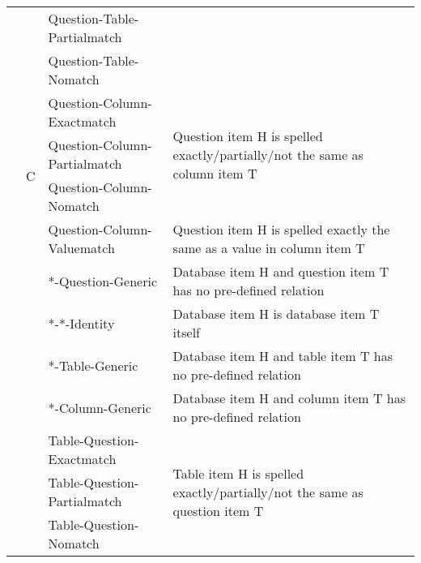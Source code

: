 \documentclass[11pt]{article}
\begin{document}
\begin{table*}
{\begin{tabular}{llll}
                        &                     & Question-Table-Partialmatch  &\\
&                     & Question-Table-Nomatch       &   
\\ \midrule
    \multirow{4}{*}{}  & \multirow{4}{*}{C}  & Question-Column-Exactmatch   & \multirow{3}{*}{Question item H is spelled exactly/partially/not the same as column item T}                                  \\
                        &                     & Question-Column-Partialmatch &                                                                                    \\
                        &                     & Question-Column-Nomatch      &                                                                                    \\ \cmidrule{3-4} 
                        &                     & Question-Column-Valuematch   &         Question item H is spelled exactly the same as a value in column item T                                                                          \\ \midrule
                     &                  & *-Question-Generic           & Database item H and question item T has no pre-defined relation                                                      \\ \midrule
                     &                  & *-*-Identity                 & Database item H is database item T itself                                                        \\ \midrule
                     &                  & *-Table-Generic              & Database item H and table item T has no pre-defined relation                                                           \\ \midrule
                     &                  & *-Column-Generic             & Database item H and column item T has no pre-defined relation                                                           \\ \midrule
    \multirow{3}{*}{}  & \multirow{3}{*}{}  & Table-Question-Exactmatch    & \multirow{3}{*}{Table item H is spelled exactly/partially/not the same as question item T}                                      \\
                        &                     & Table-Question-Partialmatch  &                                                                                    \\
                        &                     & Table-Question-Nomatch       &                                                                                    \\ \midrule

\end{tabular}}
\end{table*}
\end{document}

